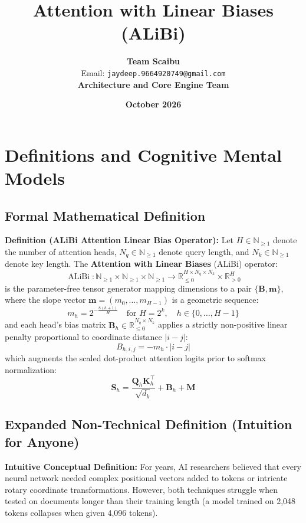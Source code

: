 \documentclass[11pt,a4paper]{article}
\title{\textbf{Attention with Linear Biases (ALiBi)}}
\author{\textbf{Team Scaibu} \\ \small Email: \texttt{jaydeep.9664920749@gmail.com} \\ \small \textbf{Architecture and Core Engine Team}}
\date{\textbf{October 2026}}
\theoremstyle{definition}
\begin{document}
\maketitle

\section{Definitions and Cognitive Mental Models}

\subsection{Formal Mathematical Definition}
\textbf{Definition (ALiBi Attention Linear Bias Operator):}
Let $H \in \mathbb{N}_{\ge 1}$ denote the number of attention heads, $N_q \in \mathbb{N}_{\ge 1}$ denote query length, and $N_k \in \mathbb{N}_{\ge 1}$ denote key length.
The \textbf{Attention with Linear Biases} (ALiBi) operator:
{\boldmath
\begin{equation}
\operatorname{ALiBi}: \mathbb{N}_{\ge 1} \times \mathbb{N}_{\ge 1} \times \mathbb{N}_{\ge 1} \longrightarrow \mathbb{R}_{\le 0}^{H \times N_q \times N_k} \times \mathbb{R}_{> 0}^H
\end{equation}
}
is the parameter-free tensor generator mapping dimensions to a pair $\{\mathbf{B}, \mathbf{m}\}$, where the slope vector $\mathbf{m} = (m_0, \dots, m_{H-1})$ is a geometric sequence:
{\boldmath
\begin{equation}
m_h = 2^{-\frac{8(h + 1)}{H}} \quad \text{for } H = 2^k, \quad h \in \{0, \dots, H-1\}
\end{equation}
}
and each head's bias matrix $\mathbf{B}_h \in \mathbb{R}_{\le 0}^{N_q \times N_k}$ applies a strictly non-positive linear penalty proportional to coordinate distance $|i - j|$:
{\boldmath
\begin{equation}
B_{h, i, j} = -m_h \cdot |i - j|
\end{equation}
}
which augments the scaled dot-product attention logits prior to softmax normalization:
{\boldmath
\begin{equation}
\mathbf{S}_h = \frac{\mathbf{Q}_h \mathbf{K}_h^\top}{\sqrt{d_k}} + \mathbf{B}_h + \mathbf{M}
\end{equation}
}

\subsection{Expanded Non-Technical Definition (Intuition for Anyone)}
\textbf{Intuitive Conceptual Definition:}
For years, AI researchers believed that every neural network needed complex positional vectors added to tokens or intricate rotary coordinate transformations. However, both techniques struggle when tested on documents longer than their training length (a model trained on 2,048 tokens collapses when given 4,096 tokens).
\end{document}

